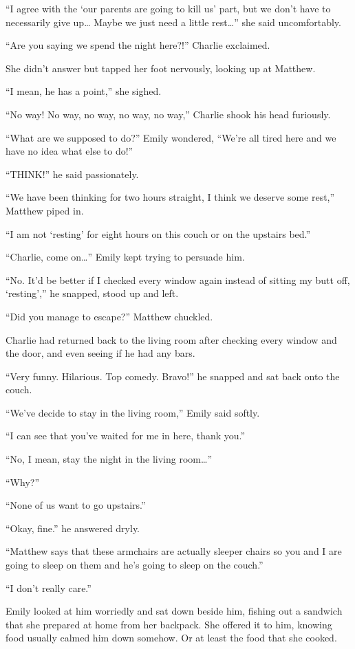 “I agree with the ‘our parents are going to kill us' part, but we don't have to necessarily give up… Maybe we just need a little rest…” she said uncomfortably.

“Are you saying we spend the night here?!” Charlie exclaimed.

She didn't answer but tapped her foot nervously, looking up at Matthew.

“I mean, he has a point,” she sighed.

“No way! No way, no way, no way, no way,” Charlie shook his head furiously.

“What are we supposed to do?” Emily wondered, “We're all tired here and we have no idea what else to do!”

“THINK!” he said passionately.

“We have been thinking for two hours straight, I think we deserve some rest,” Matthew piped in.

“I am not ‘resting' for eight hours on this couch or on the upstairs bed.”

“Charlie, come on…” Emily kept trying to persuade him.

“No. It'd be better if I checked every window again instead of sitting my butt off, ‘resting',” he snapped, stood up and left.

\bigskip

“Did you manage to escape?” Matthew chuckled.

Charlie had returned back to the living room after checking every window and the door, and even seeing if he had any bars.

“Very funny. Hilarious. Top comedy. Bravo!” he snapped and sat back onto the couch.

“We've decide to stay in the living room,” Emily said softly.

“I can see that you've waited for me in here, thank you.”

“No, I mean, stay the night in the living room…”

“Why?”

“None of us want to go upstairs.”

“Okay, fine.” he answered dryly.

“Matthew says that these armchairs are actually sleeper chairs so you and I are going to sleep on them and he's going to sleep on the couch.”

“I don't really care.”

Emily looked at him worriedly and sat down beside him, fishing out a sandwich that she prepared at home from her backpack. She offered it to him, knowing food usually calmed him down somehow. Or at least the food that she cooked.

